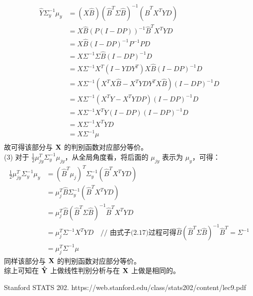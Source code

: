\documentclass{article}
\begin{document}
    \begin{equation}
    \begin{aligned}
    \hat{Y}\Sigma_y^{-1}\mu_{y} 
    &= (X\hat{B}) (\hat{B}^T \Sigma \hat{B})^{-1} (\hat{B}^T X^T YD) \\
    &= X\hat{B}(P(I-DP))^{-1}\hat{B}^T X^T YD \\
    &= X\hat{B}(I-DP)^{-1}P^{-1}PD \\
    &= X\Sigma^{-1}\Sigma\hat{B}(I-DP)^{-1}D \\
    &= X\Sigma^{-1}X^T (I-YDY^T) X\hat{B}(I-DP)^{-1}D \\
    &= X\Sigma^{-1}(X^T X\hat{B} - X^T YDY^T X\hat{B})(I-DP)^{-1}D \\
    &= X\Sigma^{-1}(X^T Y - X^T YDP)(I-DP)^{-1}D \\
    &= X\Sigma^{-1}X^T Y(I-DP)(I-DP)^{-1}D \\
    &= X\Sigma^{-1}X^T Y D \\
    &= X\Sigma^{-1}\mu \\
    \end{aligned}
    \end{equation} 
    故可得该部分与 $\bf X$ 的判别函数对应部分等价。 \\
    (3) 对于 $\frac{1}{2}\mu_{jy}^T\Sigma_y^{-1}\mu_{jy}$，从全局角度看，将后面的 $\mu_{jy}$ 表示为 $\mu_y$，可得：
    \begin{equation}
    \begin{aligned}
    \frac{1}{2}\mu_{jy}^T\Sigma_y^{-1}\mu_y
    &= (\hat{B}^T \mu_j)^T\Sigma_y^{-1}(\hat{B}^T X^T YD) \\
    &= \mu_j^T\hat{B}\Sigma_y^{-1}(\hat{B}^T X^T YD) \\
    &= \mu_j^T\hat{B}(\hat{B}^T\Sigma\hat{B})^{-1}\hat{B}^T X^T YD \\
    &= \mu_j^T\Sigma^{-1}X^T Y D \quad\text{// 由式子(2.17)过程可得$\hat{B}(\hat{B}^T\Sigma\hat{B})^{-1}\hat{B}^T = \Sigma^{-1}$}\\
    &= \mu_j^T\Sigma^{-1}\mu
    \end{aligned}
    \end{equation}
    同样该部分与 $\bf X$ 的判别函数对应部分等价。\\
    综上可知在 $\bf \hat{Y}$ 上做线性判别分析与在 $\bf X$ 上做是相同的。

    \begin{thebibliography}{10}
     Stanford STATS 202. https://web.stanford.edu/class/stats202/content/lec9.pdf
    \end{thebibliography}
    
\end{document}
